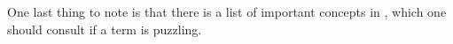 \documentclass[
 11pt,
 twoside,
 a4paper,
 final                                 %
]{article}
\begin{document}
   One last thing to note is that there is a list of important concepts in
   , which one should consult if a term is puzzling.

\rhead{\rightmark}         %


















































% 


\end{document}
